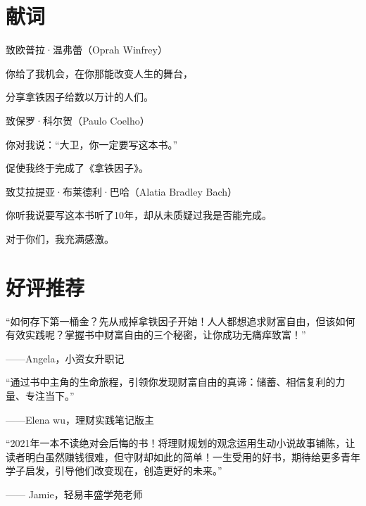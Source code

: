 \section*{献词}

\vspace{1em}
\begin{center}
{\heiti 致欧普拉·温弗蕾（Oprah Winfrey）}

{\fangsong 你给了我机会，在你那能改变人生的舞台，}

{\fangsong 分享拿铁因子给数以万计的人们。}

\vspace{2em}

致保罗·科尔贺（Paulo Coelho）

{\fangsong 你对我说：“大卫，你一定要写这本书。”}

{\fangsong 促使我终于完成了《拿铁因子》。}

\vspace{2em}

{\heiti 致艾拉提亚·布莱德利·巴哈（Alatia Bradley Bach）}

{\fangsong 你听我说要写这本书听了10年，却从未质疑过我是否能完成。}

\vspace{2em}

{\heiti 对于你们，我充满感激。}
\end{center}


\clearpage

\section*{好评推荐}

“如何存下第一桶金？先从戒掉拿铁因子开始！人人都想追求财富自由，但该如何有效实践呢？掌握书中财富自由的三个秘密，让你成功无痛痒致富！”

{\kaishu \hfill ——Angela，小资女升职记}\vspace{1em}

“通过书中主角的生命旅程，引领你发现财富自由的真谛：储蓄、相信复利的力量、专注当下。”

{\kaishu \hfill ——Elena wu，理财实践笔记版主}\vspace{1em}

“2021年一本不读绝对会后悔的书！将理财规划的观念运用生动小说故事铺陈，让读者明白虽然赚钱很难，但守财却如此的简单！一生受用的好书，期待给更多青年学子启发，引导他们改变现在，创造更好的未来。”

{\kaishu \hfill —— Jamie，轻易丰盛学苑老师}\vspace{1em}

